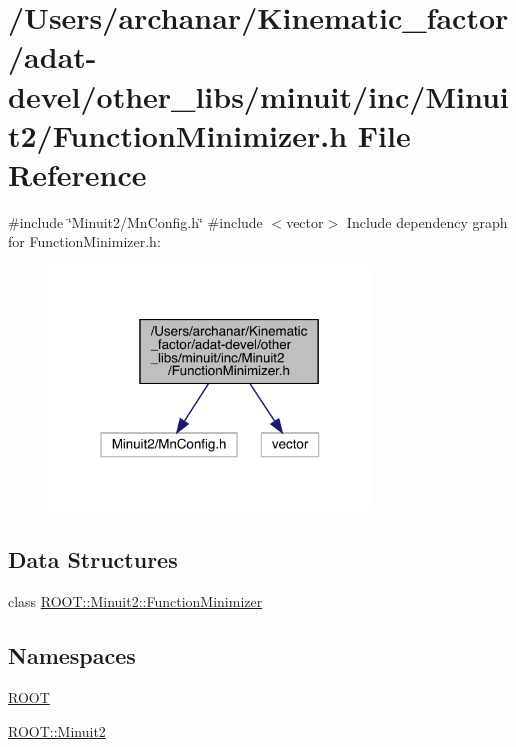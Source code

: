 \hypertarget{adat-devel_2other__libs_2minuit_2inc_2Minuit2_2FunctionMinimizer_8h}{}\section{/\+Users/archanar/\+Kinematic\+\_\+factor/adat-\/devel/other\+\_\+libs/minuit/inc/\+Minuit2/\+Function\+Minimizer.h File Reference}
\label{adat-devel_2other__libs_2minuit_2inc_2Minuit2_2FunctionMinimizer_8h}
{\ttfamily \#include \char`\"{}Minuit2/\+Mn\+Config.\+h\char`\"{}}\newline
{\ttfamily \#include $<$vector$>$}\newline
Include dependency graph for Function\+Minimizer.\+h\+:
\nopagebreak
\begin{figure}[H]
\begin{center}
\leavevmode
\includegraphics[width=244pt]{d3/dc4/adat-devel_2other__libs_2minuit_2inc_2Minuit2_2FunctionMinimizer_8h__incl}
\end{center}
\end{figure}
\subsection*{Data Structures}
\begin{DoxyCompactItemize}
\item 
class \mbox{\hyperlink{classROOT_1_1Minuit2_1_1FunctionMinimizer}{R\+O\+O\+T\+::\+Minuit2\+::\+Function\+Minimizer}}
\end{DoxyCompactItemize}
\subsection*{Namespaces}
\begin{DoxyCompactItemize}
\item 
 \mbox{\hyperlink{namespaceROOT}{R\+O\+OT}}
\item 
 \mbox{\hyperlink{namespaceROOT_1_1Minuit2}{R\+O\+O\+T\+::\+Minuit2}}
\end{DoxyCompactItemize}
